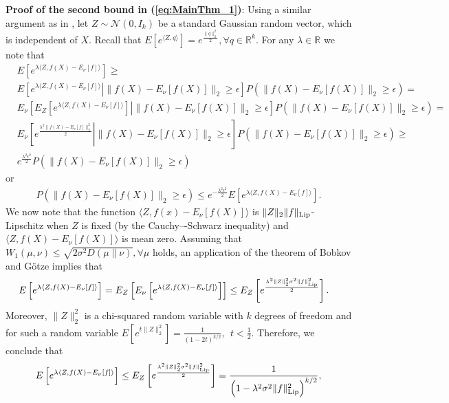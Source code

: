 \documentclass[twoside,11pt]{article}
\begin{document}
\noindent \textbf{Proof of the second bound in (\ref{eq:MainThm_1})}: Using a similar argument as in  \cite{hkz12}, let $Z\sim \mathcal{N}(0,I_k)$ be a standard Gaussian random vector, which is independent of $X$. Recall that $E[e^{\langle Z,q \rangle}]=e^{\frac{\|q\|_2^2}{2}}, \forall q\in \mathbb{R}^k$. For any $\lambda \in \mathbb{R}$ we note that
\begin{align*}
&E\left[e^{\lambda \langle Z,f(X)-E_{\nu}[f]\rangle}\right]\geq\\&  E\left.\left[e^{\lambda \langle Z, f(X)-E_{\nu}[f] \rangle}\right|\|f(X)-E_{\nu}[f(X)]\|_2\geq \epsilon\right]P(\|f(X)-E_{\nu}[f(X)]\|_2\geq \epsilon)=\\& E_{\nu}\left.\left[E_Z\left[e^{\lambda \langle Z, f(X)-E_{\nu}[f] \rangle}\right]\right|\|f(X)-E_{\nu}[f(X)]\|_2\geq \epsilon\right]P(\|f(X)-E_{\nu}[f(X)]\|_2\geq \epsilon)=\\& E_{\nu}\left.\left[e^{\frac{\lambda^2 \|f(X)-E_{\nu}[f] \|_2^2}{2}}\right|\|f(X)-E_{\nu}[f(X)]\|_2\geq \epsilon\right]P(\|f(X)-E_{\nu}[f(X)]\|_2\geq \epsilon)\geq \\& e^{\frac{\lambda^2 \epsilon^2}{2}} P(\|f(X)-E_{\nu}[f(X)]\|_2\geq \epsilon)
\end{align*}
or 
\begin{align}\label{eq:MainThm_proof_5}
P(\|f(X)-E_{\nu}[f(X)]\|_2\geq \epsilon)\leq e^{-\frac{\lambda^2 \epsilon^2}{2}} E\left[e^{\lambda \langle Z,f(X)-E_{\nu}[f]\rangle}\right].
\end{align}
We now note that the function $ \langle Z, f(x)-E_{\nu}[f(X)] \rangle$ is $\|Z\|_2\|f\|_{\rm Lip}$-Lipschitz when $Z$ is fixed (by the  Cauchy–-Schwarz inequality) and $ \langle Z, f(X)-E_{\nu}[f(X)] \rangle$ is mean zero. 
Assuming that $W_{1}(\mu,\nu)\leq \sqrt{2\sigma^2 D(\mu\|\nu)}, \forall \mu$ holds, an application of the theorem of Bobkov and G\"{o}tze  implies that 
\begin{align*}
E\left[e^{\lambda \langle Z,f(X)-E_{\nu}[f]\rangle}\right]&=E_{Z}\left[E_{\nu}\left[e^{\lambda \langle Z,f(X)-E_{\nu}[f]\rangle}\right]\right] \leq E_Z\left[e^{\frac{\lambda^2 \|Z\|_2^2\sigma^2 \|f\|_{\rm Lip}^2}{2}}\right].  
\end{align*}
Moreover, $\|Z\|_2^2$ is a chi-squared random variable with $k$ degrees of freedom and for such a random variable 
$
E\left[e^{t\|Z\|_2^2}\right]=\frac{1}{(1-2t)^{k/2}}, \ \ t<\frac{1}{2}
$. Therefore, we conclude that
\begin{align}\label{eq:MainThm_proof_6}
E\left[e^{\lambda \langle Z,f(X)-E_{\nu}[f]\rangle}\right]\leq E_Z\left[e^{\frac{\lambda^2 \|Z\|_2^2\sigma^2 \|f\|_{\rm Lip}^2}{2}}\right]= \frac{1}{\left(1-\lambda^2 \sigma^2 \|f\|_{\rm Lip}^2\right)^{k/2}},  
\end{align}
\end{document}
